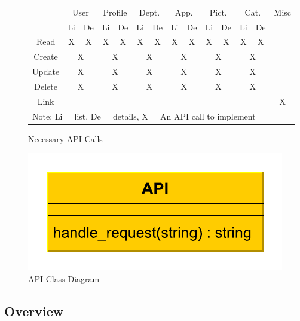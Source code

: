 \begin{figure}[ht]
\begin{tabular}[ht]{c|c|c|c|c|c|c|c|c|c|c|c|c|c|}
\cline{2-14}
&\multicolumn{2}{c|}{User}&\multicolumn{2}{c|}{Profile}&\multicolumn{2}{c|}{Dept.}&\multicolumn{2}{c|}{App.}&\multicolumn{2}{c|}{Pict.}&\multicolumn{2}{c|}{Cat.}&Misc \\
\cline{2-14}
& Li & De & Li & De & Li & De & Li & De & Li & De & Li & De & \\
\hline
\multicolumn{1}{|c|}{Read} & X & X & X & X & X & X & X & X & X & X & X & X & \\
\hline
\multicolumn{1}{|c|}{Create} & \multicolumn{2}{c|}{X} & \multicolumn{2}{c|}{X} & \multicolumn{2}{c|}{X} & \multicolumn{2}{c|}{X} &\multicolumn{2}{c|}{X} & \multicolumn{2}{c|}{X} & \\
\hline
\multicolumn{1}{|c|}{Update} & \multicolumn{2}{c|}{X} & \multicolumn{2}{c|}{X} & \multicolumn{2}{c|}{X} & \multicolumn{2}{c|}{X} &\multicolumn{2}{c|}{X} & \multicolumn{2}{c|}{X} & \\
\hline
\multicolumn{1}{|c|}{Delete} & \multicolumn{2}{c|}{X} & \multicolumn{2}{c|}{X} & \multicolumn{2}{c|}{X} & \multicolumn{2}{c|}{X} &\multicolumn{2}{c|}{X} & \multicolumn{2}{c|}{X} & \\
\hline
\multicolumn{1}{|c|}{Link} &\multicolumn{2}{c|}{}&\multicolumn{2}{c|}{}&\multicolumn{2}{c|}{}&\multicolumn{2}{c|}{}&\multicolumn{2}{c|}{}&\multicolumn{2}{c|}{}& X \\
\hline
\multicolumn{14}{l}{Note: Li = list, De = details, X = An API call to implement}
\end{tabular}
\caption{Necessary API Calls}
\label{fig:call_list}
\end{figure}

\begin{figure}[ht]
\includegraphics[scale=1]{img/api.pdf}
\caption{API Class Diagram}
\label{fig:uml_api}
\end{figure}

\subsection{Overview}

